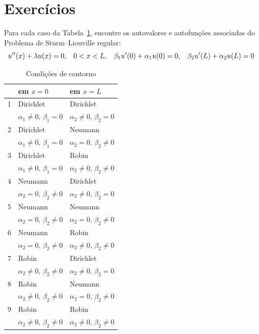 \documentclass[10pt,a4paper]{article}
\begin{document}
	\section{Exercícios}
	Para cada caso da Tabela~\ref{tbl:1}, encontre os autovalores e autofunções associadas do Problema de Sturm--Liouville regular:
	\[u''(x)+\lambda u(x)=0, \hspace{.3cm} 0<x<L, \hspace{.3cm} \beta_1u'(0)+\alpha_1u(0)=0, \hspace{.3cm}\beta_2u'(L)+\alpha_2 u(L)=0\]
	
\begin{table}[!ht]
\centering
\label{tbl:1}
\begin{tabular}{lll}
 \hline
 & em $x=0$ & em $x=L$\\
 \hline
 1 & Dirichlet & Dirichlet\\
   & $\alpha_1\neq 0,\,\beta_1=0$ & $\alpha_2\neq 0,\,\beta_2=0$\\ 
 2 & Dirichlet & Neumann\\
   & $\alpha_1\neq 0,\,\beta_1=0$ & $\alpha_2=0,\,\beta_2\neq 0$\\ 
 3 & Dirichlet & Robin\\
   & $\alpha_1\neq 0,\,\beta_1=0$ & $\alpha_2\neq 0,\,\beta_2\neq0$\\ 
   
 4 & Neumann & Dirichlet\\
   & $\alpha_2=0,\,\beta_2\neq 0$ & $\alpha_2\neq 0,\,\beta_2=0$\\ 
 5 & Neumann & Neumann\\
   & $\alpha_2=0,\,\beta_2\neq 0$ & $\alpha_2=0,\,\beta_2\neq 0$\\ 
 6 & Neumann & Robin\\
   & $\alpha_2=0,\,\beta_2\neq 0$ & $\alpha_2\neq 0,\,\beta_2\neq0$\\
   
 7 & Robin & Dirichlet\\
   & $\alpha_2\neq 0,\,\beta_2\neq0$ & $\alpha_2\neq 0,\,\beta_2=0$\\ 
 8 & Robin & Neumann\\
   & $\alpha_2\neq 0,\,\beta_2\neq0$ & $\alpha_2=0,\,\beta_2\neq 0$\\ 
 9 & Robin & Robin\\
   & $\alpha_2\neq 0,\,\beta_2\neq0$ & $\alpha_2\neq 0,\,\beta_2\neq0$\\ 
 \hline
\end{tabular}
\caption{Condições de contorno}
\end{table}
\end{document}
